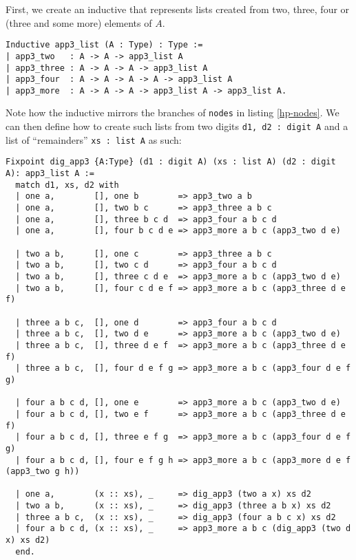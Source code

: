 \documentclass{article}
\newcommand{\code}[1]{\texttt{#1}}
\begin{document}
First, we create an inductive that represents lists created from two, three,
four or (three and some more) elements of $A$.

\begin{listing}[H]
\begin{verbatim}
Inductive app3_list (A : Type) : Type :=
| app3_two   : A -> A -> app3_list A
| app3_three : A -> A -> A -> app3_list A
| app3_four  : A -> A -> A -> A -> app3_list A
| app3_more  : A -> A -> A -> app3_list A -> app3_list A.
\end{verbatim}
\end{listing}
Note how the inductive mirrors the branches of \code{nodes}
in listing \ref{hp-nodes}.
We can then define how to create such lists from two digits \code{d1, d2 : digit A}
and a list of ``remainders'' \code{xs : list A} as such:

\begin{listing}[H]
\begin{verbatim}
Fixpoint dig_app3 {A:Type} (d1 : digit A) (xs : list A) (d2 : digit A): app3_list A :=
  match d1, xs, d2 with
  | one a,        [], one b        => app3_two a b
  | one a,        [], two b c      => app3_three a b c
  | one a,        [], three b c d  => app3_four a b c d
  | one a,        [], four b c d e => app3_more a b c (app3_two d e)

  | two a b,      [], one c        => app3_three a b c
  | two a b,      [], two c d      => app3_four a b c d
  | two a b,      [], three c d e  => app3_more a b c (app3_two d e)
  | two a b,      [], four c d e f => app3_more a b c (app3_three d e f)

  | three a b c,  [], one d        => app3_four a b c d
  | three a b c,  [], two d e      => app3_more a b c (app3_two d e)
  | three a b c,  [], three d e f  => app3_more a b c (app3_three d e f)
  | three a b c,  [], four d e f g => app3_more a b c (app3_four d e f g)

  | four a b c d, [], one e        => app3_more a b c (app3_two d e)
  | four a b c d, [], two e f      => app3_more a b c (app3_three d e f)
  | four a b c d, [], three e f g  => app3_more a b c (app3_four d e f g)
  | four a b c d, [], four e f g h => app3_more a b c (app3_more d e f (app3_two g h))

  | one a,        (x :: xs), _     => dig_app3 (two a x) xs d2
  | two a b,      (x :: xs), _     => dig_app3 (three a b x) xs d2
  | three a b c,  (x :: xs), _     => dig_app3 (four a b c x) xs d2
  | four a b c d, (x :: xs), _     => app3_more a b c (dig_app3 (two d x) xs d2)
  end.
\end{verbatim}
\end{listing}
\end{document}
